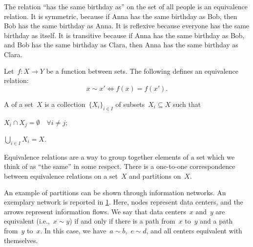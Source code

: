\begin{example}
 The relation ``has the same birthday as'' on the set of all people is an equivalence relation. It is symmetric, because if Anna has the same birthday as Bob, then Bob has the same birthday as Anna. It is reflexive because everyone has the same birthday as itself. It is transitive because if Anna has the same birthday as Bob, and Bob has the same birthday as Clara, then Anna has the same birthday as Clara.
\end{example}

\begin{example}
  Let~$f\colon X\to Y$ be a function between sets. The following defines an equivalence relation:
  \begin{equation*}
      x\sim x'\Leftrightarrow f(x)=f(x').
  \end{equation*}
\end{example}

\begin{definition}[Partition]
A \emph{} of a set~$X$ is a collection~$\{X_i\}_{i\in I}$ of subsets~$X_i\subseteq X$ such that
\begin{compactenum}
  \item $X_i\cap X_j=\emptyset \quad \forall i\neq j$;
  \item $\bigcup_{i\in I}X_i=X$.
\end{compactenum}
\end{definition}

\begin{remark}
  Equivalence relations are a way to group together elements of a set which we think of as ``the same'' in some respect. There is a one-to-one correspondence between equivalence relations on a set~$X$ and partitions on~$X$.
\end{remark}

\begin{example}
  An example of partitions can be shown through information networks. An exemplary network is reported in \cref{fig:info_network}. Here, nodes represent data centers, and the arrows represent information flows. We say that data centers~$x$ and~$y$ are equivalent (i.e.,~$x\sim y$) if and only if there is a path from~$x$ to~$y$ and a path from~$y$ to~$x$. In this case, we have~$a\sim b$,~$e\sim d$, and all centers equivalent with themselves.
\end{example}

\begin{figure}[h!]
\begin{center}
\end{center}
\caption{\label{fig:info_network}}
\end{figure}
